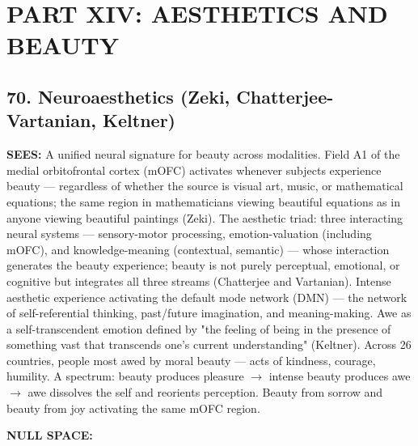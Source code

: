 \section*{PART XIV: AESTHETICS AND BEAUTY}


\subsection*{70. Neuroaesthetics (Zeki, Chatterjee-Vartanian, Keltner)}


\textbf{SEES:} A unified neural signature for beauty across modalities. Field A1 of the medial orbitofrontal cortex (mOFC) activates whenever subjects experience beauty — regardless of whether the source is visual art, music, or mathematical equations; the same region in mathematicians viewing beautiful equations as in anyone viewing beautiful paintings (Zeki). The aesthetic triad: three interacting neural systems — sensory-motor processing, emotion-valuation (including mOFC), and knowledge-meaning (contextual, semantic) — whose interaction generates the beauty experience; beauty is not purely perceptual, emotional, or cognitive but integrates all three streams (Chatterjee and Vartanian). Intense aesthetic experience activating the default mode network (DMN) — the network of self-referential thinking, past/\allowbreak future imagination, and meaning-making. Awe as a self-transcendent emotion defined by "the feeling of being in the presence of something vast that transcends one's current understanding" (Keltner). Across 26 countries, people most awed by moral beauty — acts of kindness, courage, humility. A spectrum: beauty produces pleasure $\rightarrow$ intense beauty produces awe $\rightarrow$ awe dissolves the self and reorients perception. Beauty from sorrow and beauty from joy activating the same mOFC region.


\textbf{NULL SPACE:}

